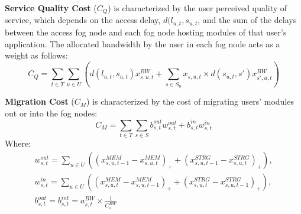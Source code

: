 \documentclass{article}
\begin{document}
\vspace{12pt}
\noindent\textbf{Service Quality Cost} ($C_Q$) is characterized by the user perceived quality of service, which depends on the access delay, $d(l_{u,t}, s_{u,t}$, and the sum of the delays between the access fog node and each fog node hosting modules of that user's application. The allocated bandwidth by the user in each fog node acts as a weight as follows:
\begin{equation}
    C_Q = \sum_{t \in T} \sum_{u \in U} \left(d(l_{u,t}, s_{u,t})x^{BW}_{s,u,t} + \sum_{s \in S_u} x_{s,u,t} \times d(s_{u,t}, s')x^{BW}_{s',u,t}\right)
\end{equation}

\vspace{12pt}
\noindent\textbf{Migration Cost} ($C_M$) is characterized by the cost of migrating users' modules out or into the fog nodes:
\begin{equation}
    C_M = \sum_{t \in T} \sum_{s \in S} b^{out}_{s,t}w^{out}_{s,t} + b^{in}_{s,t}w^{in}_{s,t}
\end{equation}
\noindent Where:
\begin{gather}
    w^{out}_{s,t} = \sum_{u \in U} \left((x^{MEM}_{s,u,t-1} - x^{MEM}_{s,u,t})_+ + (x^{STRG}_{s,u,t-1} - x^{STRG}_{s,u,t})_+\right),\\[6pt]
    w^{in}_{s,t} = \sum_{u \in U} \left((x^{MEM}_{s,u,t} - x^{MEM}_{s,u,t-1})_+ + (x^{STRG}_{s,u,t} - x^{STRG}_{s,u,t-1})_+\right),\\[6pt]
    b^{out}_{s,t} = b^{int}_{s,t} = a^{BW}_{s,t} \times \frac{1}{C^{BW}_{s}}
\end{gather}
\end{document}
